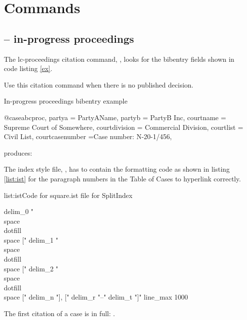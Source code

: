\section{Commands}

\subsection{ -- in-progress proceedings}
\p The lc-proceedings citation command, , looks for the bibentry fields shown in code listing \ref{ex}.

\p Use this citation command when there is no published decision.

\begin{dov}{ex}{In-progress proceedings bibentry example}

@case{abcproc,
  partya = {PartyAName},
  partyb = {PartyB Inc},
  courtname = {Supreme Court of Somewhere},
  courtdivision = {Commercial Division},
  courtlist = {Civil List},
  courtcasenumber ={Case number: N-20-1/456},
}

\end{dov}
\newpage 

\p {} produces: 

\bigskip

\p The index style file, , has to contain the formatting code as shown in listing \ref{list:ist} for the paragraph numbers in the Table of Cases to hyperlink correctly.


\begin{dov}{list:ist}{Code for square.ist file for SplitIndex}

delim_0 "\\space\\dotfill\\space ["
delim_1 "\\space\\dotfill\\space ["
delim_2 "\\space\\dotfill\\space ["
delim_n "], ["
delim_r "--"
delim_t "]"
line_max 1000

\end{dov}
\newpage

\p The first citation of a case is in full: .

